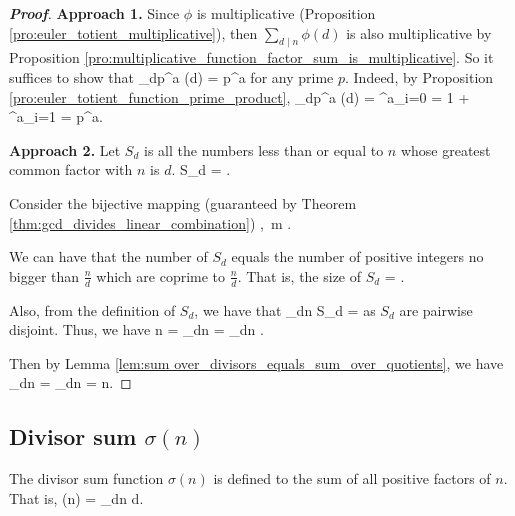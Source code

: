 \begin{proof}[\bf Proof]
{\bf Approach 1.} Since $\phi$ is multiplicative (Proposition \ref{pro:euler_totient_multiplicative}), then $\sum_{d\mid n} \phi(d)$ is also multiplicative by Proposition \ref{pro:multiplicative_function_factor_sum_is_multiplicative}. So it suffices to show that 
\be
\sum_{d\mid p^a} \phi(d) = p^a
\ee
for any prime $p$. Indeed, by Proposition \ref{pro:euler_totient_function_prime_product},
\be
\sum_{d\mid p^a} \phi(d) = \sum^a_{i=0} \phi{} = 1 + \sum^a_{i=1}  = p^a.
\ee

{\bf Approach 2.} Let $S_d$ is all the numbers less than or equal to $n$ whose greatest common factor with $n$ is $d$. 
\be
S_d = .
\ee%

Consider the bijective mapping (guaranteed by Theorem \ref{thm:gcd_divides_linear_combination}) 
\be
{} \to {},\ m \mapsto {}.
\ee


We can have that the number of $S_d$ equals the number of positive integers no bigger than $\frac nd$ which are coprime to $\frac nd$. That is, the size of $S_d$
\be
{} = \phi{}.
\ee

Also, from the definition of $S_d$, we have that
\be
\bigcup_{d\mid n} S_d = 
\ee
as $S_d$ are pairwise disjoint. Thus, we have
\be
n = \sum_{d\mid n}  = \sum_{d\mid n} \phi{}.
\ee

Then by Lemma \ref{lem:sum over_divisors_equals_sum_over_quotients}, we have
\be
\sum_{d\mid n} \phi{} = \sum_{d\mid n} \phi{} = n.
\ee
\end{proof}

\subsection{Divisor sum $\sigma(n)$}

\begin{definition}
The divisor sum function $\sigma(n)$ is defined to the sum of all positive factors of $n$. That is,
\be
\sigma(n) = \sum_{d\mid n} d.
\ee
\end{definition}

